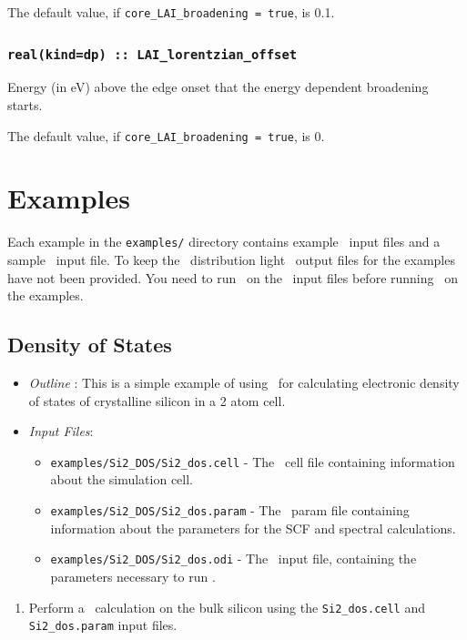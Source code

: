 \documentclass[a4paper,11pt,twoside]{book}
\begin{document}
{The default value, if \verb#core_LAI_broadening = true#, is 0.1. 

\subsection[core\_lorentzian\_offset]{\tt real(kind=dp) :: LAI\_lorentzian\_offset}
Energy (in eV) above the edge onset that the energy dependent broadening starts.  

The default value, if \verb#core_LAI_broadening = true#, is 0.


\chapter{Examples}

Each example in the \verb#examples/# directory contains example \castep\ input files and a sample \optados\ input file. To keep the \optados\ distribution light \castep\ output files for the examples have not been provided. You need to run \castep\ on the \castep\ input files before running \optados\ on the examples.

\section{Density of States}
\begin{itemize}
\item \emph{Outline} : This is a simple example of using \optados\ for calculating electronic density of states of crystalline silicon in a 2 atom cell.
\item \emph{Input Files}:
\begin{itemize}
\item \verb#examples/Si2_DOS/Si2_dos.cell# - The \castep\ cell file containing information about the simulation cell.
\item \verb#examples/Si2_DOS/Si2_dos.param# - The \castep\ param file containing information about the parameters for the SCF and spectral calculations.
\item \verb#examples/Si2_DOS/Si2_dos.odi# - The \optados\ input file, containing the parameters necessary to run \optados.
\end{itemize}
\end{itemize}

\begin{enumerate}
\item Perform a \castep\ calculation on the bulk silicon using the  \verb#Si2_dos.cell#  and \verb#Si2_dos.param# input files. 


\end{enumerate}}
\end{document}
